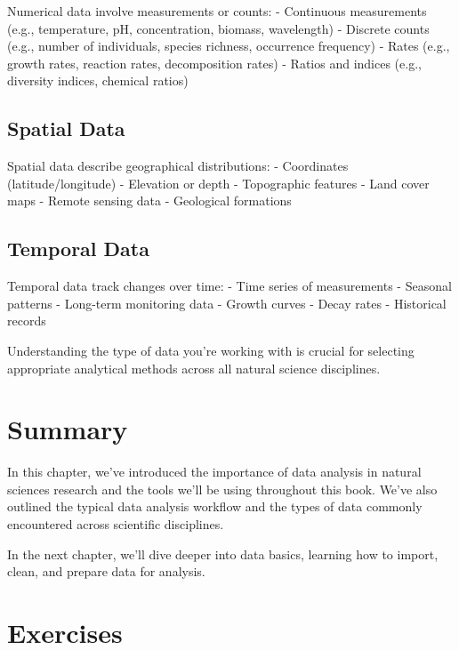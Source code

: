 \documentclass[
  letterpaper,
]{book}
\begin{document}
Numerical data involve measurements or counts: - Continuous measurements
(e.g., temperature, pH, concentration, biomass, wavelength) - Discrete
counts (e.g., number of individuals, species richness, occurrence
frequency) - Rates (e.g., growth rates, reaction rates, decomposition
rates) - Ratios and indices (e.g., diversity indices, chemical ratios)

\subsection{Spatial Data}\label{spatial-data}

Spatial data describe geographical distributions: - Coordinates
(latitude/longitude) - Elevation or depth - Topographic features - Land
cover maps - Remote sensing data - Geological formations

\subsection{Temporal Data}\label{temporal-data}

Temporal data track changes over time: - Time series of measurements -
Seasonal patterns - Long-term monitoring data - Growth curves - Decay
rates - Historical records

Understanding the type of data you're working with is crucial for
selecting appropriate analytical methods across all natural science
disciplines.

\section{Summary}\label{summary}

In this chapter, we've introduced the importance of data analysis in
natural sciences research and the tools we'll be using throughout this
book. We've also outlined the typical data analysis workflow and the
types of data commonly encountered across scientific disciplines.

In the next chapter, we'll dive deeper into data basics, learning how to
import, clean, and prepare data for analysis.

\section{Exercises}\label{exercises}
\end{document}
